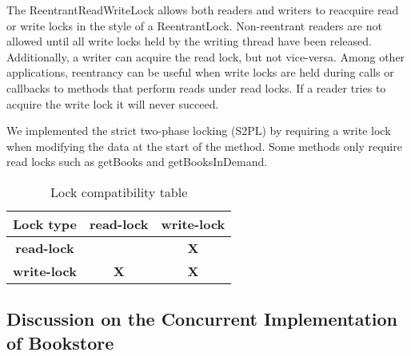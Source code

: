 \documentclass{article}      %
\begin{document}
The ReentrantReadWriteLock allows both readers and writers to reacquire read or write locks in the style of a ReentrantLock. Non-reentrant readers are not allowed until all write locks held by the writing thread have been released. Additionally, a writer can acquire the read lock, but not vice-versa. Among other applications, reentrancy can be useful when write locks are held during calls or callbacks to methods that perform reads under read locks. If a reader tries to acquire the write lock it will never succeed.

We implemented the strict two-phase locking (S2PL) by requiring a write lock when modifying the data at the start of the method. Some methods only require read locks such as getBooks and getBooksInDemand.

\begin{table}[h]
\begin{center}
\begin{tabular}{|c|c|c|}
\hline
{\bf{Lock type}} & \bf{read-lock} & \bf{write-lock} \\ \hline
\bf{read-lock} & \multicolumn{1}{l|}{} & \bf{X} \\ \hline
\bf{write-lock} & \bf{X} & \bf{X} \\ \hline
\end{tabular}
\caption{Lock compatibility table}
\label{Lock compatibility table}
\end{center}
\end{table}

\subsection*{Discussion on the Concurrent Implementation of Bookstore}
\end{document}
